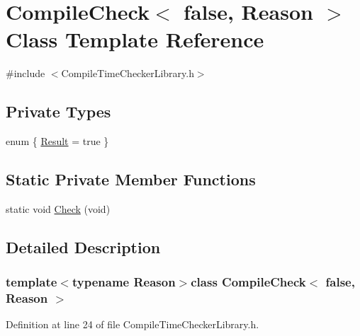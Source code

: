 \hypertarget{class_compile_check_3_01false_00_01_reason_01_4}{\section{Compile\-Check$<$ false, Reason $>$ Class Template Reference}
\label{class_compile_check_3_01false_00_01_reason_01_4}
}


{\ttfamily \#include $<$Compile\-Time\-Checker\-Library.\-h$>$}

\subsection*{Private Types}
\begin{DoxyCompactItemize}
\item 
enum \{ \hyperlink{class_compile_check_3_01false_00_01_reason_01_4_a7777002f83cd288663fad3eba2721a9ba9f7df94908ad6f5f6296d4bb2e8e0e3f}{Result} = true
 \}
\end{DoxyCompactItemize}
\subsection*{Static Private Member Functions}
\begin{DoxyCompactItemize}
\item 
static void \hyperlink{class_compile_check_3_01false_00_01_reason_01_4_a1da45a656d0ba16e65e757aa3492c1da}{Check} (void)
\end{DoxyCompactItemize}


\subsection{Detailed Description}
\subsubsection*{template$<$typename Reason$>$class Compile\-Check$<$ false, Reason $>$}



Definition at line 24 of file Compile\-Time\-Checker\-Library.\-h.



